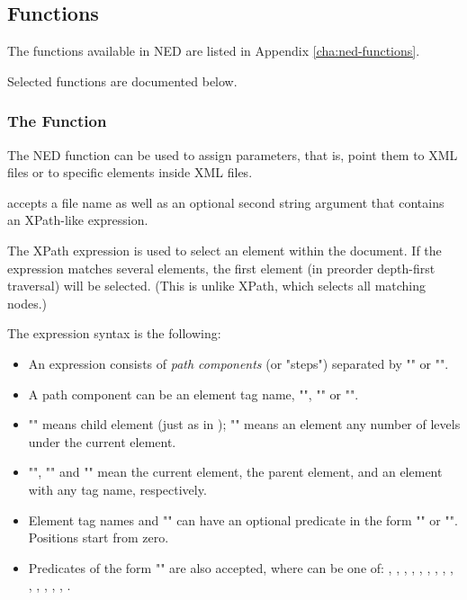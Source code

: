 \subsection{Functions}
\label{sec:ned-ref:functions}

The functions available in NED are listed in Appendix
\ref{cha:ned-functions}.

Selected functions are documented below.

\subsubsection{The  Function}
\label{sec:ned-ref:xmldoc-function}

The  NED function can be used to assign  parameters,
that is, point them to XML files or to specific elements inside XML files.

 accepts a file name as well as an optional second string argument
that contains an XPath-like expression.


The XPath expression is used to select an element within the document.
If the expression matches several elements, the first element
(in preorder depth-first traversal) will be selected. (This is
unlike XPath, which selects all matching nodes.)

The expression syntax is the following:
\begin{itemize}
  \item An expression consists of \textit{path components} (or "steps")
        separated by "\ttt{/}" or "\ttt{//}".
  \item A path component can be an element tag name, "\ttt{*}", ""
        or "".
  \item "\ttt{/}" means child element (just as in );
        "\ttt{//}" means an element any number of levels under the current element.
  \item "", "" and "\ttt{*}" mean the current element,
        the parent element, and an element with any tag name, respectively.
  \item Element tag names and "\ttt{*}" can have an optional predicate
        in the form "\ttt{[position]}" or "\ttt{[@attribute='value']}".
        Positions start from zero.
  \item Predicates of the form "\ttt{[@attribute=\textit{\$param}]}" are also
        accepted, where  can be one of:
        ,
        ,
        ,
        ,
        ,
        ,
        ,
        ,
        ,
        ,
        ,
        ,
        ,
        ,
        .
\end{itemize}

